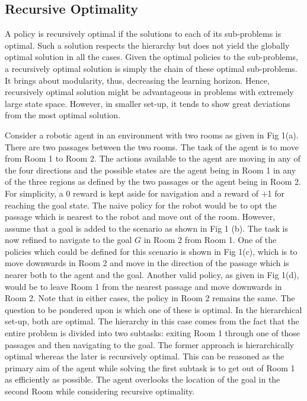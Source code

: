 \subsection{Recursive Optimality}
A policy is recursively optimal if the solutions to each of its sub-problems is optimal. Such a solution respects the hierarchy but does not yield the globally optimal solution in all the cases. Given the optimal policies to the sub-problems, a recursively optimal solution is simply the chain of these optimal sub-problems. It brings about modularity, thus, decreasing the learning horizon. Hence, recursively optimal solution might be advantageous in problems with extremely large state space. However, in smaller set-up, it tends to show great deviations from the most optimal solution. 

Consider a robotic agent in an environment with two rooms as given in Fig 1(a). There are two passages between the two rooms. The task of the agent is to move from Room 1 to Room 2. The actions available to the agent are moving in any of the four directions and the possible states are the agent being in Room 1 in any of the three regions as defined by the two passages or the agent being in Room 2.  For simplicity, a 0 reward is kept aside for navigation and a reward of +1 for reaching the goal state. The naive policy for the robot would be to opt the passage which is nearest to the robot and move out of the room. However, assume that a goal is added to the scenario as shown in Fig 1 (b). The task is now refined to navigate to the goal \(G\) in Room 2 from Room 1. One of the policies which could be defined for this scenario is shown in Fig 1(c), which is to move downwards in Room 2 and move in the direction of the passage which is nearer both to the agent and the goal. Another valid policy, as given in Fig 1(d), would be to leave Room 1 from the nearest passage and move downwards in Room 2. Note that in either cases, the policy in Room 2 remains the same. The question to be pondered upon is which one of these is optimal. In the hierarchical set-up, both are optimal. The hierarchy in this case comes from the fact that the entire problem is divided into two subtasks: exiting Room 1 through one of those passages and then navigating to the goal. The former approach is hierarchically optimal whereas the later is recursively optimal. This can be reasoned as the primary aim of the agent while solving the first subtask is to get out of Room 1 as efficiently as possible. The agent overlooks the location of the goal in the second Room while considering recursive optimality. 

